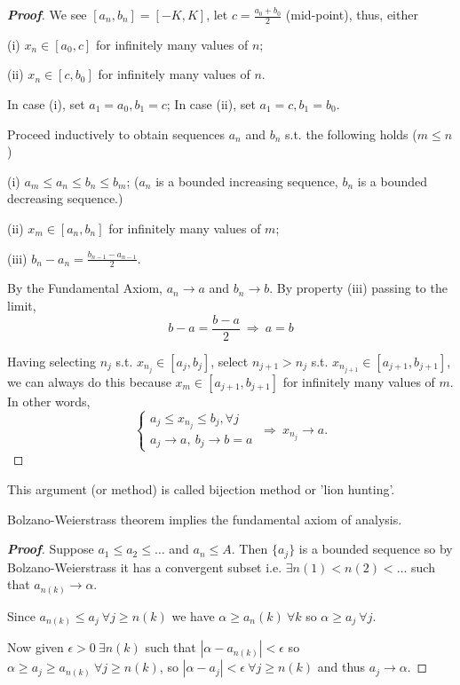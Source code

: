 \begin{proof}[{\bf Proof}]
We see $[a_n,b_n] = [-K,K]$, let $c=\frac{a_0+b_0}{2}$ (mid-point), thus, either
\ben
\item [(i)] $x_n\in[a_0,c]$ for infinitely many values of $n$;
\item [(ii)] $x_n\in[c,b_0]$ for infinitely many values of $n$.
\een

In case (i), set $a_1=a_0, b_1=c$; In case (ii), set $a_1=c,b_1=b_0$.

Proceed inductively to obtain sequences $a_n$ and $b_n$ s.t. the following holds ($m\leq n$)

\ben
\item [(i)] $a_m\leq a_n\leq b_n\leq b_m$; ($a_n$ is a bounded increasing sequence, $b_n$ is a bounded decreasing sequence.)
\item [(ii)] $x_m\in[a_n,b_n]$ for infinitely many values of $m$;
\item [(iii)] $b_n-a_n=\frac{b_{n-1}-a_{n-1}}{2}$.
\een

By the Fundamental Axiom, $a_n\to a$ and $b_n\to b$. By property (iii) passing to the limit,
\begin{equation*}
b-a = \frac{b-a}{2}\ \Rightarrow \ a=b
\end{equation*}

Having selecting $n_j$ s.t. $x_{n_j}\in[a_j,b_j]$, select $n_{j+1}>n_j$ s.t. $x_{n_{j+1}}\in[a_{j+1},b_{j+1}]$, we can always do this because $x_m\in[a_{j+1},b_{j+1}]$ for infinitely many values of $m$. In other words,
\begin{equation*}
\left\{\begin{array}{c}
a_j\leq x_{n_j} \leq b_j, \forall j\\
a_j\to a,\ b_j\to b=a
\end{array}\right.\ \Rightarrow \ x_{n_j}\to a.
\end{equation*}
\end{proof}

\begin{remark}
This argument (or method) is called bijection method or 'lion hunting'.
\end{remark}

\begin{theorem}\label{thm:bolzano_weierstrass_implies_fundamental_axiom_of_analysis}
Bolzano-Weierstrass theorem implies the fundamental axiom of analysis.
\end{theorem}

\begin{proof}[\bf Proof]
Suppose $a_1 \leq a_2 \leq \ldots$ and $a_n \leq A$. Then $\{a_j\}$ is a bounded sequence so by Bolzano-Weierstrass it has a convergent subset i.e. $\exists n(1) < n(2) < \ldots$ such that $a_{n(k)} \rightarrow \alpha$.

Since $a_{n(k)} \leq a_j \ \forall j \geq n(k)$ we have $\alpha \geq a_n(k) \ \forall k$ so $\alpha \geq a_j \ \forall j$.

Now given $\epsilon > 0 \ \exists n(k)$ such that $|\alpha - a_{n(k)}| < \epsilon$ so $\alpha \geq a_j \geq a_{n(k)} \ \forall j \geq n(k)$, so $|\alpha - a_j| < \epsilon \ \forall j \geq n(k)$ and thus $a_j \rightarrow \alpha$.
\end{proof}

